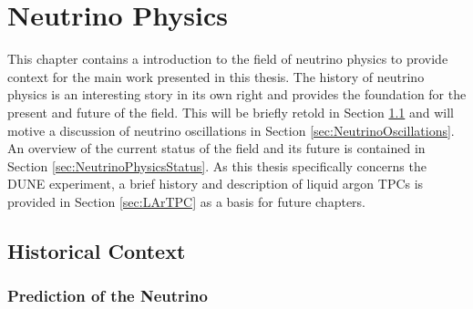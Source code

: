
\graphicspath{{NeutrinoPhysics/Figs/}}

\chapter{Neutrino Physics}\label{chap:NeutrinoPhysics}

This chapter contains a introduction to the field of neutrino physics to provide context for the main work presented in this thesis.  The history of neutrino physics is an interesting story in its own right and provides the foundation for the present and future of the field.  This will be briefly retold in Section \ref{sec:HistoricalContext} and will motive a discussion of neutrino oscillations in Section \ref{sec:NeutrinoOscillations}.  An overview of the current status of the field and its future is contained in Section \ref{sec:NeutrinoPhysicsStatus}.  As this thesis specifically concerns the DUNE experiment, a brief history and description of liquid argon TPCs is provided in Section \ref{sec:LArTPC} as a basis for future chapters.

\section{Historical Context}\label{sec:HistoricalContext}

\subsection{Prediction of the Neutrino}\label{NeutrinoPrediction}

